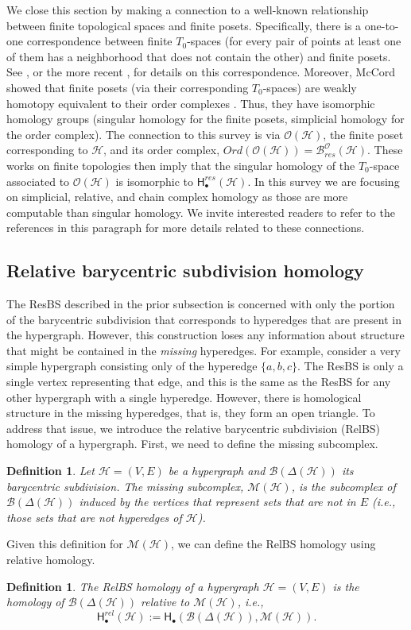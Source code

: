 \documentclass{amsart}
\newtheorem{definition}[theorem]{Definition}
\newcommand{\Hgroup}	     {\mathsf{H}}
\renewcommand{\hom}[2]{\Hgroup_{#2}^{#1}}
\renewcommand{\H}{\mathcal{H}}
\newcommand{\bary}{\mathcal{B}}
\newcommand{\missing}{\mathcal{M}}
\newcommand{\ECP}{\mathcal{O}}
\begin{document}
We close this section by making a connection to a well-known relationship between finite topological spaces and finite posets. 
Specifically, there is a one-to-one correspondence between finite $T_0$-spaces (for every pair of points at least one of them has a neighborhood that does not contain the other) and finite posets. See \cite{stong1966finite}, or the more recent \cite[Section 4]{barmak2012strong}, for details on this correspondence. 
Moreover, McCord showed that finite posets (via their corresponding $T_0$-spaces) are weakly homotopy equivalent to their order complexes \cite{mccord_singular_1966}. Thus, they have isomorphic homology groups (singular homology for the finite posets, simplicial homology for the order complex).
The connection to this survey is via $\ECP(\H)$, the finite poset corresponding to $\H$, and its order complex, $Ord(\ECP(\H)) = \bary_{res}^\ECP(\H)$. 
These works on finite topologies then imply that the singular homology of the $T_0$-space associated to $\ECP(\H)$ is isomorphic to $\hom{res}{\bullet}(\H)$. In this survey we are focusing on simplicial, relative, and chain complex homology as those are more computable than singular homology. We invite interested readers to refer to the references in this paragraph for more details related to these connections.


\subsection{Relative barycentric subdivision homology}
\label{sec:RelBS}

The ResBS described in the prior subsection is concerned with only the portion of the barycentric subdivision that corresponds to hyperedges that are present in the hypergraph.
However, this construction loses any information about structure that might be contained in the \emph{missing} hyperedges. 
For example, consider a very simple hypergraph consisting only of the hyperedge $\{a,b,c\}$. 
The ResBS is only a single vertex representing that edge, and this is the same as the ResBS for any other hypergraph with a single hyperedge.
However, there is homological structure in the missing hyperedges, that is, they form an open triangle.
To address that issue, we introduce the relative barycentric subdivision (RelBS) homology of a hypergraph.
First, we need to define the missing subcomplex.
\begin{definition}
Let $\H=(V,E)$ be a hypergraph and $\bary(\Delta(\H))$ its barycentric subdivision. 
The \emph{missing subcomplex}, $\missing(\H)$, is the subcomplex of $\bary(\Delta(\H))$ induced by the vertices that represent sets that are not in $E$ (i.e., those sets that are not hyperedges of $\H$).
\end{definition}
Given this definition for $\missing(\H)$, we can define the RelBS homology using relative homology.
\begin{definition}
The \emph{RelBS homology} of a hypergraph $\H=(V, E)$ is the homology of $\bary(\Delta(\H))$ relative to $\missing(\H)$, i.e., $$\hom{rel}{\bullet}(\H) := \hom{}{\bullet}(\bary(\Delta(\H)), \missing(\H)).$$
\end{definition}
\end{document}
